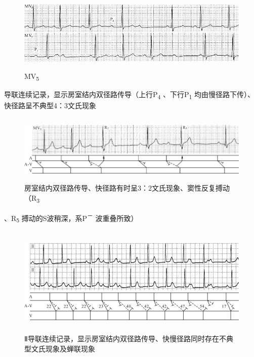 \begin{figure}[!htbp]
 \centering
 \includegraphics[width=5.58333in,height=1.48958in]{./images/Image00420.jpg}
 \captionsetup{justification=centering}
 \caption{MV\textsubscript{5}}
 \label{fig25-9}
  \end{figure} 
导联连续记录，显示房室结内双径路传导（上行P\textsubscript{4}
、下行P\textsubscript{1} 均由慢径路下传）、快径路呈不典型4：3文氏现象

\begin{figure}[!htbp]
 \centering
 \includegraphics[width=5.78125in,height=1.30208in]{./images/Image00421.jpg}
 \captionsetup{justification=centering}
 \caption{房室结内双径路传导、快径路有时呈3：2文氏现象、窦性反复搏动（R\textsubscript{3}}
 \label{fig25-10}
  \end{figure} 
、R\textsubscript{5} 搏动的S波稍深，系P\textsuperscript{－} 波重叠所致）

\begin{figure}[!htbp]
 \centering
 \includegraphics[width=5.72917in,height=2.0625in]{./images/Image00422.jpg}
 \captionsetup{justification=centering}
 \caption{Ⅱ导联连续记录，显示房室结内双径路传导、快慢径路同时存在不典型文氏现象及蝉联现象}
 \label{fig25-11}
  \end{figure} 

